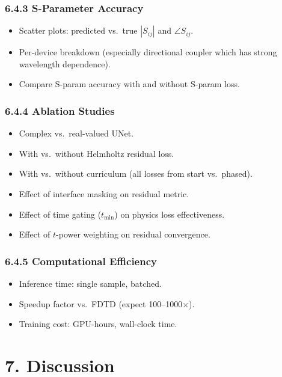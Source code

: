 \documentclass[11pt,letterpaper]{article}
\begin{document}
\subsubsection{6.4.3 S-Parameter Accuracy}
\begin{itemize}
    \item Scatter plots: predicted vs.\ true $|S_{ij}|$ and $\angle S_{ij}$.
    \item Per-device breakdown (especially directional coupler which has strong wavelength dependence).
    \item Compare S-param accuracy with and without S-param loss.
\end{itemize}

\subsubsection{6.4.4 Ablation Studies}
\begin{itemize}
    \item Complex vs.\ real-valued UNet.
    \item With vs.\ without Helmholtz residual loss.
    \item With vs.\ without curriculum (all losses from start vs.\ phased).
    \item Effect of interface masking on residual metric.
    \item Effect of time gating ($t_\text{min}$) on physics loss effectiveness.
    \item Effect of $t$-power weighting on residual convergence.
\end{itemize}

\subsubsection{6.4.5 Computational Efficiency}
\begin{itemize}
    \item Inference time: single sample, batched.
    \item Speedup factor vs.\ FDTD (expect 100--1000$\times$).
    \item Training cost: GPU-hours, wall-clock time.
\end{itemize}

\section{7. Discussion}
\end{document}
